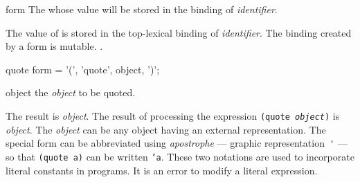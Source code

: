 \begin{optDefinition}
\begin{arguments}
    \item[form] The \form{} whose value will be stored in the binding of {\em
        identifier}.
\end{arguments}
%
\remarks%
The value of \form{} is stored in the top-lexical binding of {\em
    identifier}.  The binding created by a  form is mutable.
%
\seealso%
.

%
\Syntax
\savesyntax\quoteSyntax\vbox{\syntax
quote form
   = '(', 'quote', object, ')';
\endsyntax}
%
\begin{arguments}
    \item[object] the {\em object} to be quoted.
\end{arguments}
%
\result%
The result is {\em object}.
%
\remarks%
The result of processing the expression {\tt (quote {\em object})} is {\em
    object}.  The {\em object} can be any object having an external
representation.  The special form
 can be abbreviated using {\em apostrophe} --- graphic
representation~\verb+'+ --- so that
{\tt (quote a)} can be written {\tt 'a}.  These two notations are used to
incorporate literal constants in programs.  It
is an error to modify a literal expression.
\end{optDefinition}

